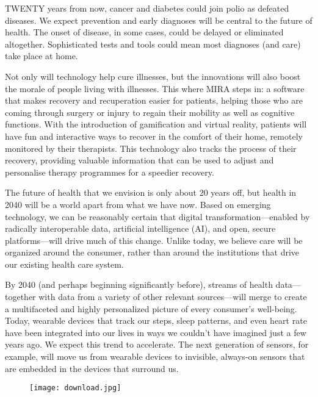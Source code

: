 \documentclass[12pt,a4paper]{report}
\begin{document}
TWENTY years from now, cancer and diabetes could join polio as defeated diseases. We expect prevention and early diagnoses will be central to the future of health. The onset of disease, in some cases, could be delayed or eliminated altogether. Sophisticated tests and tools could mean most diagnoses (and care) take place at home.\par



Not only will technology help cure illnesses, but the innovations will also boost the morale of people living with illnesses. This where MIRA steps in: a software that makes recovery and recuperation easier for patients, helping those who are coming through surgery or injury to regain their mobility as well as cognitive functions. With the introduction of gamification and virtual reality, patients will have fun and interactive ways to recover in the comfort of their home, remotely monitored by their therapists. This technology also tracks the process of their recovery,  providing valuable information that can be used to adjust and personalise therapy programmes for a speedier recovery.\par



The future of health that we envision is only about 20 years off, but health in 2040 will be a world apart from what we have now. Based on emerging technology, we can be reasonably certain that digital transformation—enabled by radically interoperable data, artificial intelligence (AI), and open, secure platforms—will drive much of this change. Unlike today, we believe care will be organized around the consumer, rather than around the institutions that drive our existing health care system.\par 

By 2040 (and perhaps beginning significantly before), streams of health data—together with data from a variety of other relevant sources—will merge to create a multifaceted and highly personalized picture of every consumer’s well-being. Today, wearable devices that track our steps, sleep patterns, and even heart rate have been integrated into our lives in ways we couldn’t have imagined just a few years ago. We expect this trend to accelerate. The next generation of sensors, for example, will move us from wearable devices to invisible, always-on sensors that are embedded in the devices that surround us.\par 

\begin{figure}
    \centering
    \texttt{[image: download.jpg]}
\end{figure}
\end{document}
